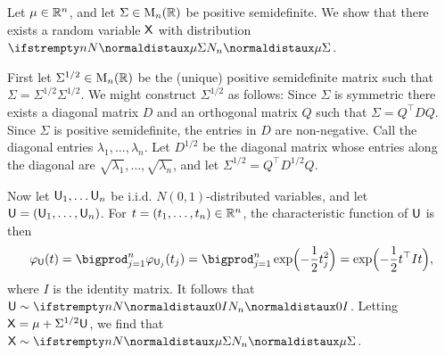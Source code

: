 \documentclass[article, a4paper, 11pt, oneside]{memoir}
\numberwithin{equation}{chapter}
\newcommand{\mat}{\mathrm{M}}
\newcommand{\trans}{\top}
\begin{document}
\begin{remark}
    Let $\mu \in \mathbb{R}^n$, and let $\Sigma \in \mat_n(\reals)$ be positive semidefinite. We show that there exists a random variable $\mathsf{X}$ with distribution $\normaldist[n]{\mu}{\Sigma}$.

    First let $\Sigma^{1/2} \in \mat_n(\reals)$ be the (unique) positive semidefinite matrix such that $\Sigma = \Sigma^{1/2} \Sigma^{1/2}$. We might construct $\Sigma^{1/2}$ as follows: Since $\Sigma$ is symmetric there exists a diagonal matrix $D$ and an orthogonal matrix $Q$ such that $\Sigma = Q^\trans DQ$. Since $\Sigma$ is positive semidefinite, the entries in $D$ are non-negative. Call the diagonal entries $\lambda_1, \ldots, \lambda_n$. Let $D^{1/2}$ be the diagonal matrix whose entries along the diagonal are $\sqrt{\lambda_1}, \ldots, \sqrt{\lambda_n}$, and let $\Sigma^{1/2} = Q^\trans D^{1/2} Q$.

    Now let $\mathsf{U}_1, \ldots \mathsf{U}_n$ be i.i.d. $N(0,1)$-distributed variables, and let $\mathsf{U} = (\mathsf{U}_1, \ldots, \mathsf{U}_n)$. For $t = (t_1, \ldots, t_n) \in \mathbb{R}^n$, the characteristic function of $\mathsf{U}$ is then
    \begin{equation*}
        \phi_{\rvar U}(t)
            = \bigprod_{j=1}^n \phi_{\rvar U_j}(t_j)
            = \bigprod_{j=1}^n \exp \Bigl( - \frac{1}{2} t_j^2 \Bigr)
            = \exp \Bigl( - \frac{1}{2} t^\trans I t \Bigr),
    \end{equation*}
    where $I$ is the identity matrix. It follows that $\rvar U \dist \normaldist[n]{0}{I}$. Letting $\mathsf{X} = \mu + \Sigma^{1/2} \mathsf{U}$, we find that $\rvar X \dist \normaldist[n]{\mu}{\Sigma}$.
\end{remark}
\end{document}
